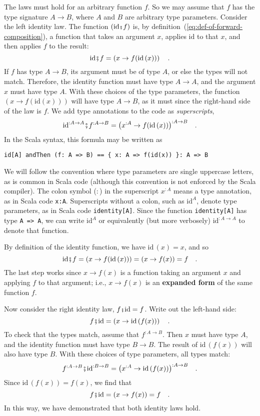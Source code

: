 The laws must hold for an arbitrary function $f$. So we may assume
that $f$ has the type signature $A\rightarrow B$, where $A$ and
$B$ are arbitrary type parameters. Consider the left identity law.
The function $(\text{id}\bef f)$ is, by definition~(\ref{eq:def-of-forward-composition}),
a function that takes an argument $x$, applies $\text{id}$ to that
$x$, and then applies $f$ to the result: 
\[
\text{id}\bef f=\left(x\rightarrow f(\text{id}\,(x))\right)\quad.
\]
If $f$ has type $A\rightarrow B$, its argument must be of type $A$,
or else the types will not match. Therefore, the identity function
must have type $A\rightarrow A$, and the argument $x$ must have
type $A$. With these choices of the type parameters, the function
$\left(x\rightarrow f(\text{id}(x))\right)$ will have type $A\rightarrow B$,
as it must since the right-hand side of the law is $f$. We add type
annotations to the code as \emph{superscripts},
\[
\text{id}^{:A\rightarrow A}\bef f^{:A\rightarrow B}=\big(x^{:A}\rightarrow f(\text{id}\,(x))\big)^{:A\rightarrow B}\quad.
\]
In the Scala syntax, this formula may be written as
\begin{lstlisting}
id[A] andThen (f: A => B) == { x: A => f(id(x)) }: A => B
\end{lstlisting}

We will follow the convention where type parameters are single uppercase
letters, as is common in Scala code (although this convention is not
enforced by the Scala compiler). The colon symbol ($:$) in the superscript
$x^{:A}$ means a type annotation, as in Scala code \lstinline!x:A!.
Superscripts without a colon, such as $\text{id}^{A}$, denote type
parameters, as in Scala code \lstinline!identity[A]!. Since the function
\lstinline!identity[A]! has type \lstinline!A => A!, we can write
$\text{id}^{A}$ or equivalently (but more verbosely) $\text{id}^{:A\rightarrow A}$
to denote that function.

By definition of the identity function, we have $\text{id}\,(x)=x$,
and so 
\[
\text{id}\bef f=\left(x\rightarrow f(\text{id}\,(x))\right)=\left(x\rightarrow f(x)\right)=f\quad.
\]
The last step works since $x\rightarrow f(x)$ is a function taking
an argument $x$ and applying $f$ to that argument; i.e., $x\rightarrow f(x)$
is an \textbf{expanded form} of
the same function $f$.

Now consider the right identity law, $f\bef\text{id}=f$. Write out
the left-hand side:
\[
f\bef\text{id}=\left(x\rightarrow\text{id}\,(f(x))\right)\quad.
\]
To check that the types match, assume that $f^{:A\rightarrow B}$.
Then $x$ must have type $A$, and the identity function must have
type $B\rightarrow B$. The result of $\text{id}\,(f(x))$ will also
have type $B$. With these choices of type parameters, all types match:
\[
f^{:A\rightarrow B}\bef\text{id}^{:B\rightarrow B}=\big(x^{:A}\rightarrow\text{id}\,(f(x))\big)^{:A\rightarrow B}\quad.
\]
Since $\text{id}\,(f(x))=f(x)$, we find that 
\[
f\bef\text{id}=\left(x\rightarrow f(x)\right)=f\quad.
\]
In this way, we have demonstrated that both identity laws hold. 

